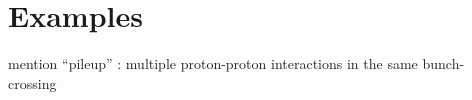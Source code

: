 \section{Examples}
\label{sec:examples}

mention ``pileup'' : multiple proton-proton interactions in the same bunch-crossing
